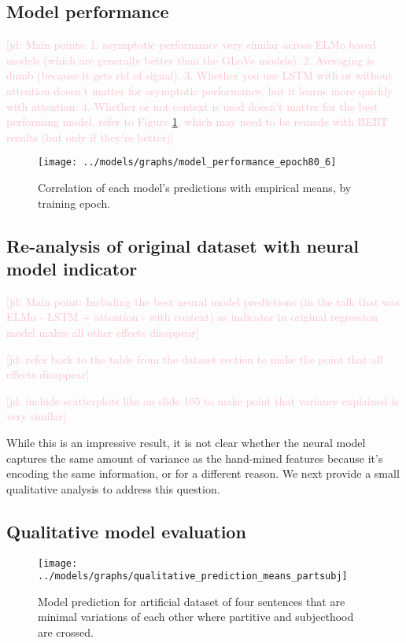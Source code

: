 \documentclass[11pt,a4paper]{article}
\newcommand{\figref}[1]{Figure \ref{#1}}
\newcommand{\jd}[1]{\textcolor{Pink}{[jd: #1]}}
\begin{document}
\subsection{Model performance}

\jd{Main points: 1. asymptotic performance very similar across ELMo based models (which are generally better than the GLoVe models). 2. Averaging is dumb (because it gets rid of signal). 3. Whether you use LSTM with or without attention doesn't matter for asymptotic performance, but it learns more quickly with attention. 4. Whether or not context is used doesn't matter for the best performing model. refer to \figref{fig:modelperformance}, which may need to be remade with BERT results (but only if they're better)}

\begin{figure}
	\texttt{[image: ../models/graphs/model\_performance\_epoch80\_6]}
	\caption{Correlation of each model's predictions with empirical means, by training epoch.}
	\label{fig:modelperformance}
\end{figure}

\subsection{Re-analysis of original dataset with neural model indicator}

\jd{Main point: Including the best neural model predictions (in the talk that was ELMo - LSTM + attention - with context) as indicator in original regression model makes all other effects disappear}
 
\jd{refer back to the table from the dataset section to make the point that all effects disappear}

\jd{include scatterplots like on slide 105 to make point that variance explained is very similar}

While this is an impressive result, it is not clear whether the neural model captures the same amount of variance as the hand-mined features because it's encoding the same information, or for a different reason. We next provide a small qualitative analysis to address this question.

\subsection{Qualitative model evaluation}


\begin{figure}
	\texttt{[image: ../models/graphs/qualitative\_prediction\_means\_partsubj]}
	\caption{Model prediction for artificial dataset of four sentences that are minimal variations of each other where partitive and subjecthood are crossed.}
	\label{fig:modelqualitative}
\end{figure}
\end{document}

